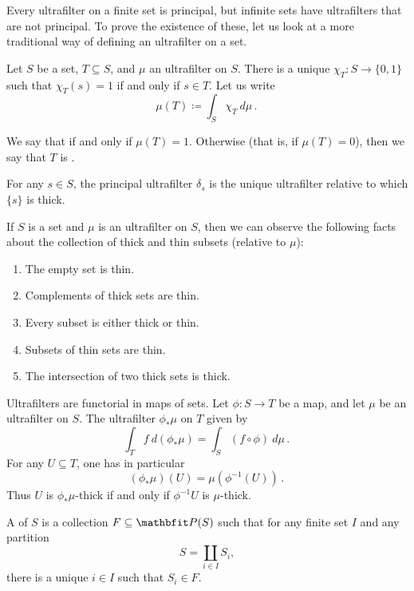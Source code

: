 Every ultrafilter on a finite set is principal,
but infinite sets have ultrafilters that are not principal.
To prove the existence of these, let us look at a more traditional way of defining an ultrafilter on a set.

\begin{dfn}
	Let $ S $ be a set, $ T \subseteq S$, and $ \mu $ an ultrafilter on $ S $.
	There is a unique  $ \chi_T \colon S \to \{ 0,1 \}$ such that $ \chi_T(s) = 1 $ if and only if $ s \in T $.
	Let us write
	\[
		\mu(T) \coloneq \int_S \chi_T \ d \mu \period
	\]
	
	We say that  if and only if $\mu(T) = 1$.
	Otherwise (that is, if $ \mu(T) = 0 $), then we say that $ T $ is .

	For any $ s \in S$, the principal ultrafilter $ \delta_s $ is the unique ultrafilter relative to which $ \{ s \} $ is thick.
\end{dfn}

\begin{nul}
	If $ S $ is a set and $ \mu $ is an ultrafilter on $ S $, then we can observe the following facts about the collection of thick and thin subsets (relative to $ \mu $):
	\begin{enumerate}[(1)]
		\item The empty set is thin.
		\item Complements of thick sets are thin.
		\item Every subset is either thick or thin.
		\item Subsets of thin sets are thin.
		\item The intersection of two thick sets is thick.
	\end{enumerate}
\end{nul}

\begin{nul}
	Ultrafilters are functorial in maps of sets.
	Let $ \phi \colon S \to T $ be a map, and let $ \mu $ be an ultrafilter on $ S $.
	The ultrafilter $ \phi_{\ast}\mu $ on $ T $ given by
	\[
		\int_T f \ d (\phi_{\ast}\mu) = \int_S (f \circ \phi) \ d \mu \period
	\]
	For any $ U \subseteq T$, one has in particular
	\[
		(\phi_{\ast} \mu)(U) = \mu (\phi^{-1}(U)) \period
	\]
	Thus $ U $ is $ \phi_{\ast} \mu $-thick if and only if $ \phi^{-1} U $ is $ \mu $-thick.
\end{nul}

\begin{dfn}
	A  of $ S $ is a collection $ F \subseteq \PP(S) $ such that for any finite set $ I $ and any partition
	\[
		S = \coprod_{ i \in I } S_i \comma
	\]
	there is a unique $ i \in I $ such that $ S_i \in F $.
\end{dfn}

